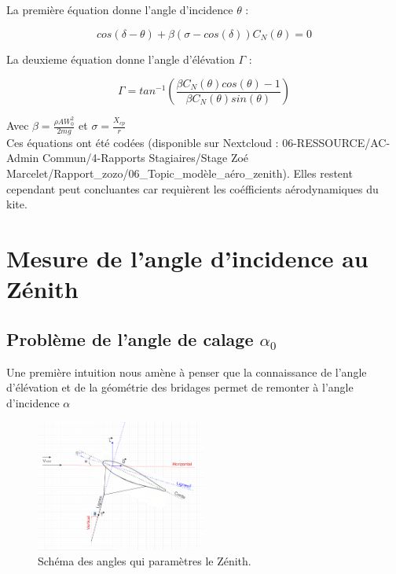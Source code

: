 \documentclass[conference]{IEEEtran}
\begin{document}
La première équation donne l’angle d’incidence $\theta$ : 
\begin{center}
    \begin{equation}
        cos(\delta - \theta) + \beta (\sigma-cos(\delta))C_N(\theta) = 0
        \label{eq:theta}
    \end{equation}
\end{center}
La deuxieme équation donne l’angle d’élévation $\Gamma$ :
\begin{center}
    \begin{equation}
        \Gamma = tan^{-1}(\frac{\beta C_N (\theta) cos(\theta)-1}{\beta C_N (\theta)sin(\theta)})
        \label{eq:gamma}
    \end{equation}
\end{center}
Avec $\beta = \frac{\rho A W_0^2}{2mg}$ et $\sigma = \frac{X_{cp}}{r}$ \\

Ces équations ont été codées (disponible sur Nextcloud : 06-RESSOURCE/AC-Admin Commun/4-Rapports Stagiaires/Stage Zoé Marcelet/Rapport\_zozo/06\_Topic\_modèle\_aéro\_zenith). 
Elles restent cependant peut concluantes car requièrent les coéfficients aérodynamiques du kite. 

\IEEEpeerreviewmaketitle
\section{Mesure de l'angle d'incidence au Zénith}

\subsection{Problème de l'angle de calage $\alpha_0$} 


Une première intuition nous amène à penser que la connaissance de l'angle d'élévation et de la géométrie des bridages permet de remonter à l'angle d'incidence $\alpha$

\begin{figure}[H]
    \centering
    \includegraphics[width=0.5\textwidth]{Pics/Schéma Equilibre Zéntih.png}  
    \caption{Schéma des angles qui paramètres le Zénith.}
    \label{fig:Zénith alpha zéro}
\end{figure}
\end{document}
